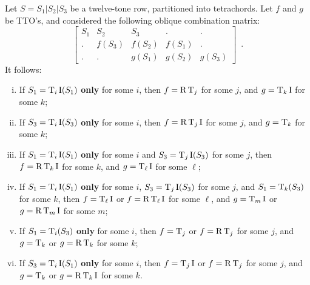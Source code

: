 \begin{example}
	\cite[241]{Martino1961}
	\label{ex:oblique}
	Let $S = S_1 | S_2 | S_3$ be a twelve-tone row, partitioned into tetrachords. Let $f$ and $g$ be TTO's, and considered the following oblique combination matrix:
	\begin{equation}
    	\left[
    	\begin{array}{c|c|c|c|c}
        	S_1 & S_2 & S_3 & . & . \\
        	. & f(S_3) & f(S_2) & f(S_1) & . \\
        	. & . & g(S_1) & g(S_2) & g(S_3)
    	\end{array}
    	\right] \enspace.
	\end{equation}
	It follows:
	\begin{enumerate}[i.]
		\item If $S_1 = \operatorname{T}_i\operatorname{I}(S_1)$ \textbf{only} for some $i$, then $f = \operatorname{R}\operatorname{T}_j$ for some $j$, and $g = \operatorname{T}_k\operatorname{I}$ for some $k$;
		\item If $S_3 = \operatorname{T}_i\operatorname{I}(S_3)$ \textbf{only} for some $i$, then $f = \operatorname{R}\operatorname{T}_j\operatorname{I}$ for some $j$, and $g = \operatorname{T}_k$ for some $k$;
		\item If $S_1 = \operatorname{T}_i\operatorname{I}(S_1)$ \textbf{only} for some $i$ and $S_3 = \operatorname{T}_j\operatorname{I}(S_3)$ for some $j$, then $f = \operatorname{R}\operatorname{T}_k\operatorname{I}$ for some $k$, and $g = \operatorname{T}_\ell\operatorname{I}$ for some $\ell$;
		\item If $S_1 = \operatorname{T}_i\operatorname{I}(S_1)$ \textbf{only} for some $i$, $S_3 = \operatorname{T}_j\operatorname{I}(S_3)$ for some $j$, and $S_1 = \operatorname{T}_k(S_3)$ for some $k$, then $f = \operatorname{T}_\ell\operatorname{I}$ or $f = \operatorname{R}\operatorname{T}_\ell\operatorname{I}$ for some $\ell$, and $g = \operatorname{T}_m\operatorname{I}$ or $g = \operatorname{R}\operatorname{T}_m\operatorname{I}$ for some $m$;
		\item If $S_1 = \operatorname{T}_i(S_3)$ \textbf{only} for some $i$, then $f = \operatorname{T}_j$ or $f = \operatorname{R}\operatorname{T}_j$ for some $j$, and $g = \operatorname{T}_k$ or $g = \operatorname{R}\operatorname{T}_k$ for some $k$;
		\item If $S_3 = \operatorname{T}_i\operatorname{I}(S_1)$ \textbf{only} for some $i$, then $f = \operatorname{T}_j\operatorname{I}$ or $f = \operatorname{R}\operatorname{T}_j$ for some $j$, and $g = \operatorname{T}_k$ or $g = \operatorname{R}\operatorname{T}_k\operatorname{I}$ for some $k$.
	\end{enumerate}
\end{example}



















